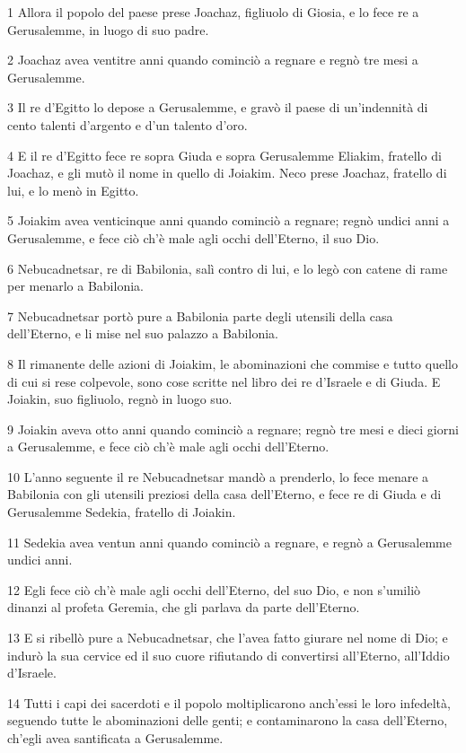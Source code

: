 \par 1 Allora il popolo del paese prese Joachaz, figliuolo di Giosia, e lo fece re a Gerusalemme, in luogo di suo padre.
\par 2 Joachaz avea ventitre anni quando cominciò a regnare e regnò tre mesi a Gerusalemme.
\par 3 Il re d'Egitto lo depose a Gerusalemme, e gravò il paese di un'indennità di cento talenti d'argento e d'un talento d'oro.
\par 4 E il re d'Egitto fece re sopra Giuda e sopra Gerusalemme Eliakim, fratello di Joachaz, e gli mutò il nome in quello di Joiakim. Neco prese Joachaz, fratello di lui, e lo menò in Egitto.
\par 5 Joiakim avea venticinque anni quando cominciò a regnare; regnò undici anni a Gerusalemme, e fece ciò ch'è male agli occhi dell'Eterno, il suo Dio.
\par 6 Nebucadnetsar, re di Babilonia, salì contro di lui, e lo legò con catene di rame per menarlo a Babilonia.
\par 7 Nebucadnetsar portò pure a Babilonia parte degli utensili della casa dell'Eterno, e li mise nel suo palazzo a Babilonia.
\par 8 Il rimanente delle azioni di Joiakim, le abominazioni che commise e tutto quello di cui si rese colpevole, sono cose scritte nel libro dei re d'Israele e di Giuda. E Joiakin, suo figliuolo, regnò in luogo suo.
\par 9 Joiakin aveva otto anni quando cominciò a regnare; regnò tre mesi e dieci giorni a Gerusalemme, e fece ciò ch'è male agli occhi dell'Eterno.
\par 10 L'anno seguente il re Nebucadnetsar mandò a prenderlo, lo fece menare a Babilonia con gli utensili preziosi della casa dell'Eterno, e fece re di Giuda e di Gerusalemme Sedekia, fratello di Joiakin.
\par 11 Sedekia avea ventun anni quando cominciò a regnare, e regnò a Gerusalemme undici anni.
\par 12 Egli fece ciò ch'è male agli occhi dell'Eterno, del suo Dio, e non s'umiliò dinanzi al profeta Geremia, che gli parlava da parte dell'Eterno.
\par 13 E si ribellò pure a Nebucadnetsar, che l'avea fatto giurare nel nome di Dio; e indurò la sua cervice ed il suo cuore rifiutando di convertirsi all'Eterno, all'Iddio d'Israele.
\par 14 Tutti i capi dei sacerdoti e il popolo moltiplicarono anch'essi le loro infedeltà, seguendo tutte le abominazioni delle genti; e contaminarono la casa dell'Eterno, ch'egli avea santificata a Gerusalemme.
